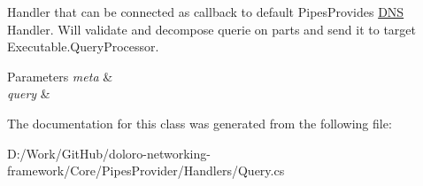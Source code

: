 Handler that can be connected as callback to default Pipes\+Provides \mbox{\hyperlink{class_pipes_provider_1_1_handlers_1_1_d_n_s}{D\+NS}} Handler. Will validate and decompose querie on parts and send it to target Executable.\+Query\+Processor. 


\begin{DoxyParams}{Parameters}
{\em meta} & \\
\hline
{\em query} & \\
\hline
\end{DoxyParams}


The documentation for this class was generated from the following file\+:\begin{DoxyCompactItemize}
\item 
D\+:/\+Work/\+Git\+Hub/doloro-\/networking-\/framework/\+Core/\+Pipes\+Provider/\+Handlers/Query.\+cs\end{DoxyCompactItemize}
